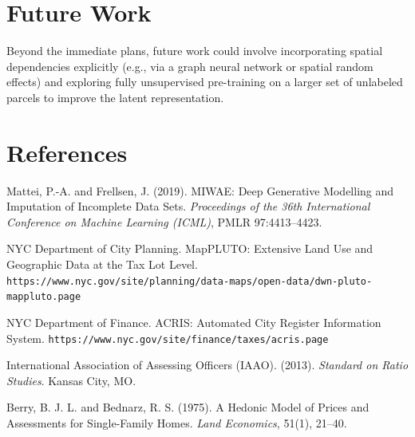 \documentclass[11pt]{article}
\begin{document}
\section*{Future Work}
Beyond the immediate plans, future work could involve incorporating spatial dependencies explicitly (e.g., via a graph neural network or spatial random effects) and exploring fully unsupervised pre-training on a larger set of unlabeled parcels to improve the latent representation.

\section*{References}

\begin{enumerate}[label={[\arabic*]}, leftmargin=*, itemsep=0pt]
    \item Mattei, P.-A. and Frellsen, J. (2019). MIWAE: Deep Generative Modelling and Imputation of Incomplete Data Sets. \textit{Proceedings of the 36th International Conference on Machine Learning (ICML)}, PMLR 97:4413--4423.
    \item NYC Department of City Planning. MapPLUTO: Extensive Land Use and Geographic Data at the Tax Lot Level. \texttt{https://www.nyc.gov/site/planning/data-maps/open-data/dwn-pluto-mappluto.page}
    \item NYC Department of Finance. ACRIS: Automated City Register Information System. \texttt{https://www.nyc.gov/site/finance/taxes/acris.page}
    \item International Association of Assessing Officers (IAAO). (2013). \textit{Standard on Ratio Studies}. Kansas City, MO.
    \item Berry, B. J. L. and Bednarz, R. S. (1975). A Hedonic Model of Prices and Assessments for Single-Family Homes. \textit{Land Economics}, 51(1), 21--40.
\end{enumerate}
\end{document}
